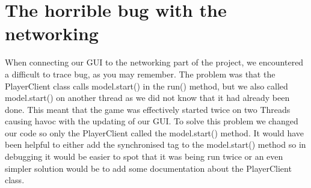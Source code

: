 \documentclass[a4paper, 12pt]{article}
\begin{document}
\section{The horrible bug with the networking}
When connecting our GUI to the networking part of the project, we encountered a difficult to trace bug, as you may remember. The problem was that the PlayerClient class calls model.start() in the run() method, but we also called model.start() on another thread as we did not know that it had already been done. This meant that the game was effectively started twice on two Threads causing havoc with the updating of our GUI. To solve this problem we changed our code so only the PlayerClient called the model.start() method. It would have been helpful to either add the synchronised tag to the model.start() method so in debugging it would be easier to spot that it was being run twice or an even simpler solution would be to add some documentation about the PlayerClient class.
\end{document}
